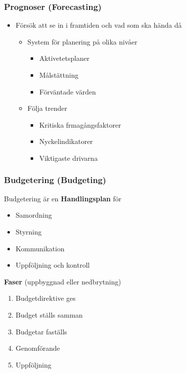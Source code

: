 \subsubsection{Prognoser (Forecasting)}
\begin{itemize}
    \item Försök att se in i framtiden och vad som ska hända då 
    \begin{itemize}
        \item System för planering på olika nivåer
        \begin{itemize}
            \item Aktivetetsplaner
            \item Målstättning
            \item Förväntade värden
        \end{itemize}
        \item Följa trender
        \begin{itemize}
            \item Kritiska frmagångsfaktorer
            \item Nyckelindikatorer
            \item Viktigaste drivarna
        \end{itemize}
    \end{itemize}
\end{itemize}

\subsubsection{Budgetering (Budgeting)}
Budgetering är en \textbf{Handlingsplan} för 
\begin{itemize}
    \item Samordning
    \item Styrning
    \item Kommunikation
    \item Uppföljning och kontroll
\end{itemize}

\textbf{Faser} (uppbyggnad eller nedbrytning)
\begin{enumerate}
    \item Budgetdirektive ges
    \item Budget ställs samman 
    \item Budgetar faställs
    \item Genomförande
    \item Uppföljning
\end{enumerate}

